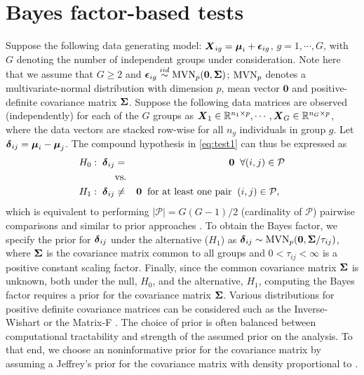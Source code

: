 \documentclass[times,sort&compress,3p]{elsarticle}
\theoremstyle{plain}%
\theoremstyle{definition}
\def\bzero{{\mathbf 0}}
\newcommand{\uzero}            {\mbox{\boldmath$0$}}
\def\MVN{\hbox{MVN}}
\def\be{\begin{eqnarray}}
\def\ee{\end{eqnarray}}
\def\bzero{{\mathbf 0}}
\newcommand{\uS}       {\mbox{\boldmath$S$}}
\newcommand{\uX}       {\mbox{\boldmath$X$}}
\newcommand{\udelta}            {\mbox{\boldmath$\delta$}}
\newcommand{\uepsilon}          {\mbox{\boldmath$\epsilon$}}
\newcommand{\umu}               {\mbox{\boldmath$\mu$}}
\newcommand{\uSigma}            {\mbox{\boldmath$\Sigma$}}
\begin{document}
\section{Bayes factor-based tests} \label{sec:test}
Suppose the following data generating model: $\uX_{ig} = \umu_i + \uepsilon_{ig}$, $g = 1, \cdots, G$, with $G$ denoting the number of independent groups under consideration.
Note here that we assume that $G \geq 2$ and $\uepsilon_{ig} \stackrel{iid}{\sim} \MVN_{p}(\bzero, \uSigma)$; $\MVN_{p}$ denotes a multivariate-normal distribution with dimension $p$, mean vector $\bzero$ and positive-definite covariance matrix $\uSigma$. Suppose the following data matrices are observed (independently) for each of the $G$ groups as $\uX_1 \in \mathbb{R}^{n_1 \times p}, \cdots,  \uX_G \in \mathbb{R}^{n_G \times p}$, where the data vectors are stacked row-wise for all $n_g$ individuals in group $g$. 
Let $\udelta_{ij} = \umu_i - \umu_j$. The compound hypothesis in \eqref{eq:test1} can thus be expressed as
\be
H_0:\; \udelta_{ij} &=& \uzero\;\;\forall (i,j) \in \mathcal{P} \nonumber \\
 &\mbox{vs.}& \nonumber \\
 H_1: \; \udelta_{ij}  &\neq & \uzero\;\;\mbox{for at least one pair}\;\;(i,j) \in \mathcal{P},\;\; \label{eq:hyp1} 
\ee
which is equivalent to performing $|\mathcal{P}| = G(G-1)/2$ (cardinality of $\mathcal{P}$) pairwise comparisons and similar to prior approaches \cite{ahmad2014u,tony2014two}. To obtain the Bayes factor, we specify the prior for $\udelta_{ij}$ under the alternative ($H_1$) as $\udelta_{ij} \sim \MVN_{p}(\uzero, \uSigma/\tau_{ij})$, where $\uSigma$ is the covariance matrix common to all groups and $ 0 < \tau_{ij} < \infty$ is a positive constant scaling factor. Finally, since the common covariance matrix $\uSigma$ is unknown, both under the null, $H_0$, and the alternative, $H_1$, computing the Bayes factor requires a prior for the covariance matrix $\uSigma$. Various distributions for positive definite covariance matrices can be considered such as the Inverse-Wishart or the Matrix-F \cite{mulder2018matrix}. The choice of prior is often balanced between computational tractability and strength of the assumed prior on the analysis. To that end, we choose an noninformative prior for the covariance matrix by assuming a Jeffrey's prior for the covariance matrix with density proportional to {\color{red}{$P(\uSigma) \propto |\uSigma|^{-(p+1)/2}$}}. 
\end{document}
